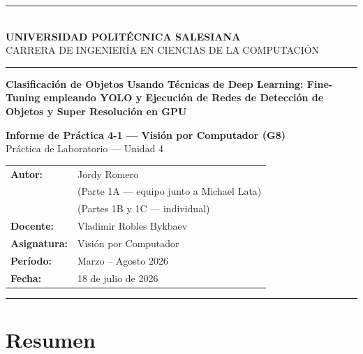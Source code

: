 \documentclass[12pt,a4paper]{article}
\begin{document}

\begin{titlepage}
  \centering
  \rule{\linewidth}{1.5pt}\\[0.4cm]
  {\large\bfseries UNIVERSIDAD POLITÉCNICA SALESIANA}\\[0.1cm]
  {\normalsize CARRERA DE INGENIERÍA EN CIENCIAS DE LA COMPUTACIÓN}\\[0.2cm]
  \rule{\linewidth}{0.8pt}

  \vspace{2cm}

  \parbox{0.85\textwidth}{\centering\LARGE\bfseries\color{salesiana}
    Clasificación de Objetos Usando Técnicas de Deep Learning: Fine-Tuning
    empleando YOLO y Ejecución de Redes de Detección de Objetos y
    Super Resolución en GPU
  }

  \vspace{1.5cm}

  {\large\bfseries Informe de Práctica 4-1 — Visión por Computador (G8)}\\[0.2cm]
  {\normalsize Práctica de Laboratorio — Unidad 4}

  \vspace{1.5cm}

  \begin{tabular}{ll}
    \textbf{Autor:}      & Jordy Romero \\[0.1cm]
                         & \small(Parte 1A — equipo junto a Michael Lata) \\
                         & \small(Partes 1B y 1C — individual) \\[0.3cm]
    \textbf{Docente:}    & Vladimir Robles Bykbaev \\[0.3cm]
    \textbf{Asignatura:} & Visión por Computador \\[0.3cm]
    \textbf{Período:}    & Marzo -- Agosto 2026 \\[0.3cm]
    \textbf{Fecha:}      & 18 de julio de 2026 \\
  \end{tabular}

  \vfill
  \rule{\linewidth}{1.5pt}
\end{titlepage}

\section*{Resumen}
\end{document}

